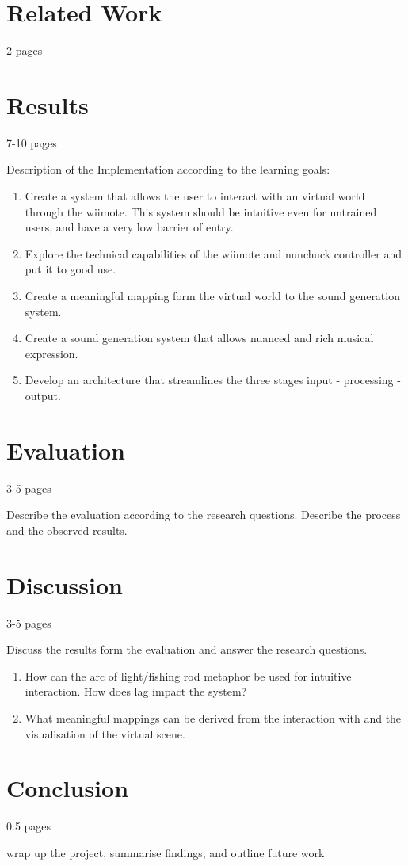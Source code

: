 \documentclass[10pt,a4paper]{scrartcl}
\begin{document}
\section{Related Work}
2 pages

\section{Results}
7-10 pages

Description of the Implementation according to the learning goals:

\begin{enumerate}
\item Create a system that allows the user to interact with an virtual world through the wiimote. This system should be intuitive even for untrained users, and have a very low barrier of entry.

\item Explore the technical capabilities of the wiimote and nunchuck controller and put it to good use.

\item Create a meaningful mapping form the virtual world to the sound generation system.

\item Create a sound generation system that allows nuanced and rich musical expression.
\item  Develop an architecture that streamlines the three stages input - processing - output.
\end{enumerate}

\section{Evaluation}
3-5 pages

Describe the evaluation according to the research questions. Describe the process and the observed results.


\section{Discussion}
3-5 pages

Discuss the results form the evaluation and answer the research questions. 

\begin{enumerate}
\item How can the arc of light/fishing rod metaphor be used for intuitive interaction. How does lag impact the system?
\item What meaningful mappings can be derived from the interaction with and the visualisation of the virtual scene.
\end{enumerate}

\section{Conclusion}
0.5 pages

wrap up the project, summarise findings, and outline future work






\end{document}
